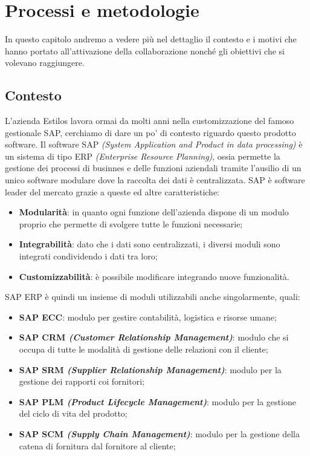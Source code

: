
\hypertarget{(chap:capitolo2)}{}
\chapter{Processi e metodologie}
In questo capitolo andremo a vedere più nel dettaglio il contesto e i motivi che hanno portato all'attivazione della collaborazione nonché gli obiettivi che si volevano raggiungere. 

\section{Contesto}
L'azienda Estilos lavora ormai da molti anni nella customizzazione del famoso gestionale SAP, cerchiamo di dare un po' di contesto riguardo questo prodotto software.
Il software SAP \textit{(System Application and Product in data processing)} è un sistema di tipo ERP \textit{(Enterprise Resource Planning)}, ossia permette la gestione dei processi di businnes e delle funzioni aziendali tramite l'ausilio di un unico software modulare dove la raccolta dei dati è centralizzata.
SAP è software leader del mercato grazie a queste ed altre caratteristiche:
\begin{itemize}
	\item \textbf{Modularità}: in quanto ogni funzione dell'azienda dispone di un modulo proprio che permette di svolgere tutte le funzioni necessarie;
	\item \textbf{Integrabilità}: dato che i dati sono centralizzati, i diversi moduli sono integrati condividendo i dati tra loro;
	\item \textbf{Customizzabilità}: è possibile modificare  integrando nuove funzionalità.
\end{itemize}

SAP ERP è quindi un insieme di moduli utilizzabili anche singolarmente, quali:
\begin{itemize}
	\item \textbf{SAP ECC}: modulo per gestire contabilità, logistica e risorse umane;
	\item \textbf{SAP CRM \textit{(Customer Relationship Management)}}: modulo che si occupa di tutte le modalità di gestione delle relazioni con il cliente;
	\item \textbf{SAP SRM \textit{(Supplier Relationship Management)}}: modulo per la gestione dei rapporti coi fornitori;
	\item \textbf{SAP PLM \textit{(Product Lifecycle Management)}}: modulo per la gestione del ciclo di vita del prodotto;
	\item \textbf{SAP SCM \textit{(Supply Chain Management)}}: modulo per la gestione della catena di fornitura dal fornitore al cliente;
\end{itemize}

